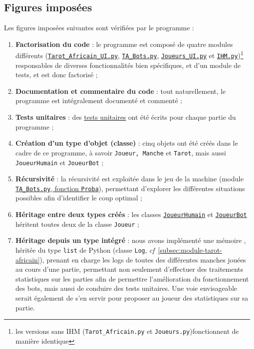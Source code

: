    \subsection{Figures imposées}\label{subsec:figures-imposées}
      Les figures imposées suivantes sont vérifiées par le programme :
      \begin{enumerate}
         \item \textbf{Factorisation du code} : le programme est composé de quatre modules différents (\hyperref[subsec:module-tarot-africain]{\texttt{Tarot\_Africain\_UI.py}}, \hyperref[subsec:module-ta-bots]{\texttt{TA\_Bots.py}}, \hyperref[subsec:module-joueurs]{\texttt{Joueurs\_UI.py}} et \hyperref[subsec:module-ihm]{\texttt{IHM.py}})\footnote{les versions sans IHM (\texttt{Tarot\_Africain.py} et \texttt{Joueurs.py})fonctionnent de manière identique} responsables de diverses fonctionnalités bien spécifiques, et d'un module de tests, et est donc factorisé ;
         \item \textbf{Documentation et commentaire du code} : tout naturellement, le programme est intégralement documenté et commenté ;
         \item \textbf{Tests unitaires} : des \hyperref[subsec:tests-effectués]{tests unitaires} ont été écrits pour chaque partie du programme ;
         \item \textbf{Création d'un type d'objet (classe)} : cinq objets ont été créés dans le cadre de ce programme, à savoir \texttt{Joueur, Manche} et \texttt{Tarot}, mais aussi \texttt{JoueurHumain} et \texttt{JoueurBot} ;
         \item \textbf{Récursivité} : la récursivité est exploitée dans le jeu de la machine (module \hyperref[subsec:module-ta-bots]{\texttt{TA\_Bots.py}, fonction \texttt{Proba}}), permettant d'explorer les différentes situations possibles afin d'identifier le coup optimal ;
         \item \textbf{Héritage entre deux types créés} : les classes \hyperref[subsec:module-joueurs]{\texttt{JoueurHumain}} et \hyperref[subsec:module-joueurs]{\texttt{JoueurBot}} héritent toutes deux de la classe \texttt{Joueur} ;
         \item \textbf{Héritage depuis un type intégré} : nous avons implémenté une \og mémoire \fg{}, héritée du type \texttt{list} de Python (classe \texttt{Log}, \textit{cf}~\ref{subsec:module-tarot-africain}), prenant en charge les logs de toutes des différentes manches jouées au cours d'une partie, permettant non seulement d'effectuer des traitements statistiques sur les parties afin de permettre l'amélioration du fonctionnement des bots, mais aussi de conduire des tests unitaires.
         Une voie envisageable serait également de s'en servir pour proposer au joueur des statistiques sur sa partie.
      \end{enumerate}

